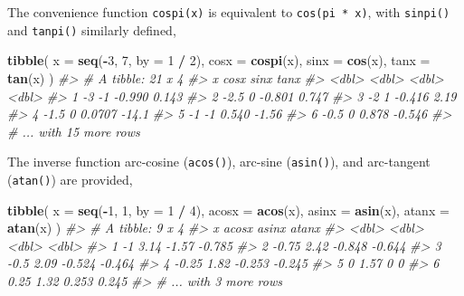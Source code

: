 \documentclass[]{book}
\newenvironment{Shaded}{\begin{snugshade}}{\end{snugshade}}
\newcommand{\CommentTok}[1]{\textcolor[rgb]{0.56,0.35,0.01}{\textit{#1}}}
\newcommand{\DataTypeTok}[1]{\textcolor[rgb]{0.13,0.29,0.53}{#1}}
\newcommand{\DecValTok}[1]{\textcolor[rgb]{0.00,0.00,0.81}{#1}}
\newcommand{\KeywordTok}[1]{\textcolor[rgb]{0.13,0.29,0.53}{\textbf{#1}}}
\newcommand{\NormalTok}[1]{#1}
\newcommand{\OperatorTok}[1]{\textcolor[rgb]{0.81,0.36,0.00}{\textbf{#1}}}
\newcommand{\StringTok}[1]{\textcolor[rgb]{0.31,0.60,0.02}{#1}}
\theoremstyle{plain}
\theoremstyle{remark}
\begin{document}
The convenience function \texttt{cospi(x)} is equivalent to
\texttt{cos(pi\ *\ x)}, with \texttt{sinpi()} and \texttt{tanpi()}
similarly defined,

\begin{Shaded}
\begin{Highlighting}[]
\KeywordTok{tibble}\NormalTok{(}
  \DataTypeTok{x =} \KeywordTok{seq}\NormalTok{(}\OperatorTok{-}\DecValTok{3}\NormalTok{, }\DecValTok{7}\NormalTok{, }\DataTypeTok{by =} \DecValTok{1} \OperatorTok{/}\StringTok{ }\DecValTok{2}\NormalTok{),}
  \DataTypeTok{cosx =} \KeywordTok{cospi}\NormalTok{(x),}
  \DataTypeTok{sinx =} \KeywordTok{cos}\NormalTok{(x),}
  \DataTypeTok{tanx =} \KeywordTok{tan}\NormalTok{(x)}
\NormalTok{)}
\CommentTok{#> # A tibble: 21 x 4}
\CommentTok{#>       x  cosx    sinx    tanx}
\CommentTok{#>   <dbl> <dbl>   <dbl>   <dbl>}
\CommentTok{#> 1  -3      -1 -0.990    0.143}
\CommentTok{#> 2  -2.5     0 -0.801    0.747}
\CommentTok{#> 3  -2       1 -0.416    2.19 }
\CommentTok{#> 4  -1.5     0  0.0707 -14.1  }
\CommentTok{#> 5  -1      -1  0.540   -1.56 }
\CommentTok{#> 6  -0.5     0  0.878   -0.546}
\CommentTok{#> # ... with 15 more rows}
\end{Highlighting}
\end{Shaded}

The inverse function arc-cosine (\texttt{acos()}), arc-sine
(\texttt{asin()}), and arc-tangent (\texttt{atan()}) are provided,

\begin{Shaded}
\begin{Highlighting}[]
\KeywordTok{tibble}\NormalTok{(}
  \DataTypeTok{x =} \KeywordTok{seq}\NormalTok{(}\OperatorTok{-}\DecValTok{1}\NormalTok{, }\DecValTok{1}\NormalTok{, }\DataTypeTok{by =} \DecValTok{1} \OperatorTok{/}\StringTok{ }\DecValTok{4}\NormalTok{),}
  \DataTypeTok{acosx =} \KeywordTok{acos}\NormalTok{(x),}
  \DataTypeTok{asinx =} \KeywordTok{asin}\NormalTok{(x),}
  \DataTypeTok{atanx =} \KeywordTok{atan}\NormalTok{(x)}
\NormalTok{)}
\CommentTok{#> # A tibble: 9 x 4}
\CommentTok{#>       x acosx  asinx  atanx}
\CommentTok{#>   <dbl> <dbl>  <dbl>  <dbl>}
\CommentTok{#> 1 -1     3.14 -1.57  -0.785}
\CommentTok{#> 2 -0.75  2.42 -0.848 -0.644}
\CommentTok{#> 3 -0.5   2.09 -0.524 -0.464}
\CommentTok{#> 4 -0.25  1.82 -0.253 -0.245}
\CommentTok{#> 5  0     1.57  0      0    }
\CommentTok{#> 6  0.25  1.32  0.253  0.245}
\CommentTok{#> # ... with 3 more rows}
\end{Highlighting}
\end{Shaded}
\end{document}
